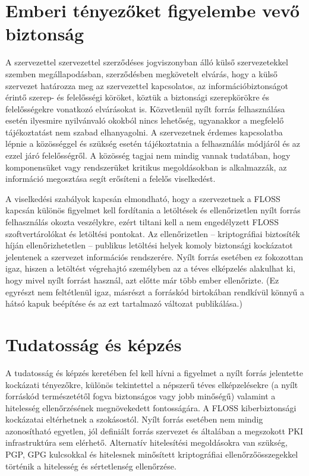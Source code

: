 \documentclass[12pt,magyar,a4paper,oneside]{scrreprt}
\begin{document}
\hypertarget{emberi-tuxe9nyezux151ket-figyelembe-vevux151-biztonsuxe1g}{%
\section{Emberi tényezőket figyelembe vevő
biztonság}\label{emberi-tuxe9nyezux151ket-figyelembe-vevux151-biztonsuxe1g}}

A szervezettel szervezettel szerződéses jogviszonyban álló külső
szervezetekkel szemben megállapodásban, szerződésben megkövetelt
elvárás, hogy a külső szervezet határozza meg az szervezettel
kapcsolatos, az információbiztonságot érintő szerep- és felelősségi
köröket, köztük a biztonsági szerepkörökre és felelősségekre vonatkozó
elvárásokat is. Közvetlenül nyílt forrás felhasználása esetén ilyesmire
nyilvánvaló okokból nincs lehetőség, ugyanakkor a megfelelő
tájékoztatást nem szabad elhanyagolni. A szervezetnek érdemes
kapcsolatba lépnie a közösséggel és szükség esetén tájékoztatnia a
felhasználás módjáról és az ezzel járó felelősségről. A közösség tagjai
nem mindig vannak tudatában, hogy komponensüket vagy rendszerüket
kritikus megoldásokban is alkalmazzák, az információ megosztása segít
erősíteni a felelős viselkedést.

A viselkedési szabályok kapcsán elmondható, hogy a szervezetnek a FLOSS
kapcsán különös figyelmet kell fordítania a letöltések és ellenőrizetlen
nyílt forrás felhasználás okozta veszélykre, ezért tiltani kell a nem
engedélyzett FLOSS szoftvertárolókat és letöltési pontokat. Az
ellenőrizetlen -- kriptográfiai biztosíték híján ellenőrizhetetlen --
publikus letöltési helyek komoly biztonsági kockázatot jelentenek a
szervezet információs rendszerére. Nyílt forrás esetében ez fokozottan
igaz, hiszen a letöltést végrehajtó személyben az a téves elképzelés
alakulhat ki, hogy mivel nyílt forrást használ, azt előtte már több
ember ellenőrizte. (Ez egyrészt nem feltétlenül igaz, másrészt a
forráskód birtokában rendkívül könnyű a hátsó kapuk beépítése és az ezt
tartalmazó változat publikálása.)

\hypertarget{tudatossuxe1g-uxe9s-kuxe9pzuxe9s}{%
\section{Tudatosság és képzés}\label{tudatossuxe1g-uxe9s-kuxe9pzuxe9s}}

A tudatosság és képzés keretében fel kell hívni a figyelmet a nyílt
forrás jelentette kockázati tényezőkre, különös tekintettel a népszerű
téves elképzelésekre (a nyílt forráskód természetétől fogva biztonságos
vagy jobb minőségű) valamint a hitelesség ellenőrzésének megnövekedett
fontosságára. A FLOSS kiberbiztonsági kockázatai eltérhetnek a
szokásostól. Nyílt forrás esetében nem mindig azonosítható egyetlen, jól
definiált forrás szervezet és általában a megszokott PKI infrastruktúra
sem elérhető. Alternatív hitelesítési megoldásokra van szükség, PGP, GPG
kulcsokkal és hitelesnek minősített kriptográfiai ellenőrzőösszegekkel
történik a hitelesség és sértetlenség ellenőrzése.
\end{document}
